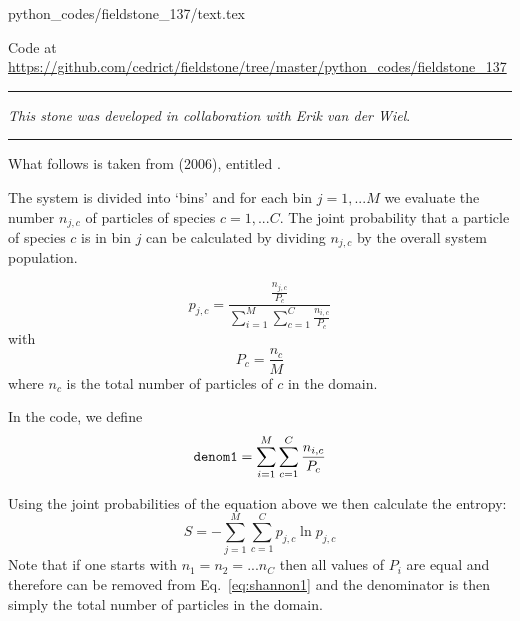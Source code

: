 \begin{flushright} {\tiny {\color{gray} python\_codes/fieldstone\_137/text.tex}} \end{flushright}

%

\begin{center}

Code at \url{https://github.com/cedrict/fieldstone/tree/master/python_codes/fieldstone_137}
\end{center}

\par\noindent\rule{\textwidth}{0.4pt}

{\sl This stone was developed in collaboration with Erik van der Wiel}. 

\par\noindent\rule{\textwidth}{0.4pt}

What follows is taken from \textcite{cakm06} (2006), entitled \textcite{cakm06}. 

The system is divided into `bins' and for each bin $j=1,...M$ we evaluate the number $n_{j,c}$
of particles of species $c=1,...C$.
The joint probability that a particle of species $c$
is in bin $j$ can be calculated by dividing $n_{j,c}$ by the overall system population.

\begin{equation}
p_{j,c} = \frac{\frac{n_{j,c}}{P_c}}{\sum\limits_{i=1}^M \sum\limits_{c=1}^C \frac{n_{i,c}}{P_c}}
\label{eq:shannon1}
\end{equation}
with 
\[
P_c = \frac{n_c}{M}
\]
where $n_c$ is the total number of particles of $c$ in the domain.

In the code, we define
\[
{\tt denom1}=\sum\limits_{i=1}^M \sum\limits_{c=1}^C \frac{n_{i,c}}{P_c}
\]

Using the joint probabilities of the equation above we then calculate the entropy:
\begin{equation}
S= -\sum_{j=1}^M \sum_{c=1}^C p_{j,c} \ln p_{j,c}
\label{eq:shannon2}
\end{equation}
Note that if one starts with $n_1=n_2=...n_C$ then all values of $P_i$ are equal and 
therefore can be removed from Eq.~\eqref{eq:shannon1} and the denominator is then simply 
the total number of particles in the domain.

